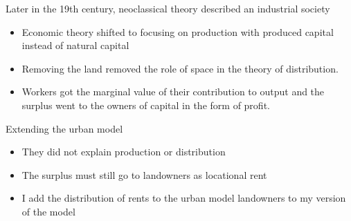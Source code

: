 \documentclass[]{beamer} %
\begin{document}
\begin{frame}{Later in the 19th century, neoclassical theory described  an industrial society}
\begin{itemize}
\item Economic theory shifted to focusing on production with produced capital instead of natural capital


\item Removing the land removed the role of space in the theory of distribution.

\item Workers got the marginal value of their contribution to output and the surplus went to the owners of capital in the form of profit. 

\end{itemize}
\end{frame}


\begin{frame}{Extending the urban model}
\begin{itemize}\Large
    \item They did not explain production or distribution
    \item     The surplus must still go to landowners as locational rent
    \item I add the distribution of rents to the urban model landowners to my version of the model
\end{itemize}
\end{frame}
\end{document}
